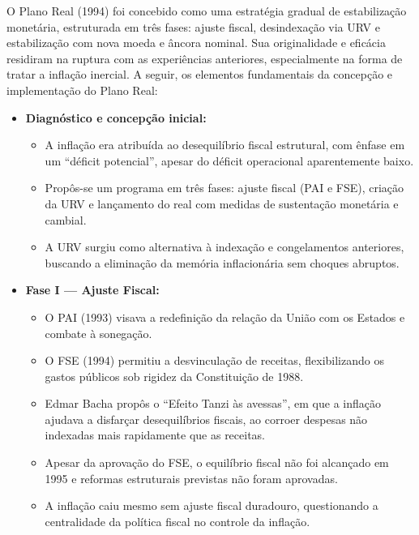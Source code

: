 \documentclass[a4paper,12pt]{article}[abntex2]
\begin{document}
O Plano Real (1994) foi concebido como uma estratégia gradual de estabilização monetária, estruturada em três fases: ajuste fiscal, desindexação via URV e estabilização com nova moeda e âncora nominal. Sua originalidade e eficácia residiram na ruptura com as experiências anteriores, especialmente na forma de tratar a inflação inercial. A seguir, os elementos fundamentais da concepção e implementação do Plano Real:

\begin{itemize}

    \item \textbf{Diagnóstico e concepção inicial:}
    \begin{itemize}
        \item A inflação era atribuída ao desequilíbrio fiscal estrutural, com ênfase em um “déficit potencial”, apesar do déficit operacional aparentemente baixo.
        \item Propôs-se um programa em três fases: ajuste fiscal (PAI e FSE), criação da URV e lançamento do real com medidas de sustentação monetária e cambial.
        \item A URV surgiu como alternativa à indexação e congelamentos anteriores, buscando a eliminação da memória inflacionária sem choques abruptos.
    \end{itemize}

    \item \textbf{Fase I — Ajuste Fiscal:}
    \begin{itemize}
        \item O PAI (1993) visava a redefinição da relação da União com os Estados e combate à sonegação.
        \item O FSE (1994) permitiu a desvinculação de receitas, flexibilizando os gastos públicos sob rigidez da Constituição de 1988.
        \item Edmar Bacha propôs o “Efeito Tanzi às avessas”, em que a inflação ajudava a disfarçar desequilíbrios fiscais, ao corroer despesas não indexadas mais rapidamente que as receitas.
        \item Apesar da aprovação do FSE, o equilíbrio fiscal não foi alcançado em 1995 e reformas estruturais previstas não foram aprovadas.
        \item A inflação caiu mesmo sem ajuste fiscal duradouro, questionando a centralidade da política fiscal no controle da inflação.
    \end{itemize}


\end{itemize}
\end{document}
